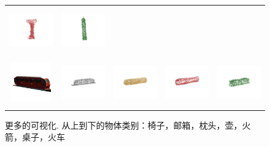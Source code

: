 \documentclass[bachelor, nocolorlinks, printoneside]{seuthesis} %
\begin{document}
\begin{Appendix}{}
\begin{figure}[!h]
\begin{tabular}{c@{}c@{}c@{}c@{}c@{}}
            \includegraphics[width=0.18\columnwidth,height=2cm]{figs/supp_real_dataset/AE/tower_f584f1a14904b958ba9419f3b43eb3bd_pred.png} &
            \includegraphics[width=0.18\columnwidth,height=2cm]{figs/supp_real_dataset/oracle/tower_f584f1a14904b958ba9419f3b43eb3bd_oracle.png} \\
            \vspace{-5mm}
            \includegraphics[width=0.11\columnwidth,height=1.7cm]{figs/supp_real_dataset/Image/train_537decdce3079c857addcf2661f94d39.png} &
            \includegraphics[width=0.18\columnwidth,height=2cm]{figs/supp_real_dataset/GT/train_537decdce3079c857addcf2661f94d39_gt.png} &
            \includegraphics[width=0.18\columnwidth,height=2cm]{figs/supp_real_dataset/AE_label/train_537decdce3079c857addcf2661f94d39_label.png} &
            \includegraphics[width=0.18\columnwidth,height=2cm]{figs/supp_real_dataset/AE/train_537decdce3079c857addcf2661f94d39_pred.png} &
            \includegraphics[width=0.18\columnwidth,height=2cm]{figs/supp_real_dataset/oracle/train_537decdce3079c857addcf2661f94d39_oracle.png} \\
            \end{tabular}
            \caption{\small 更多的可视化. 从上到下的物体类别：椅子，邮箱，枕头，壶，火箭，桌子，火车}
            \label{fig:visualize_KC_supplementary}
        \end{figure}
        \clearpage


\end{Appendix}
\end{document}
